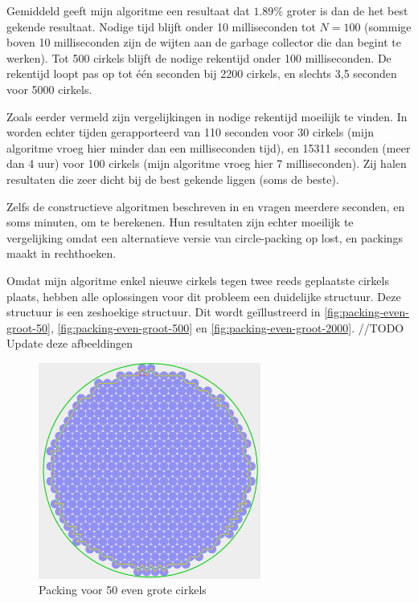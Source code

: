 \documentclass[12pt,a4paper,oneside]{book}
\begin{document}
 \label{table:packomania-equal}

Gemiddeld geeft mijn algoritme een resultaat dat $1.89\%$ groter is dan de het best gekende resultaat.
Nodige tijd blijft onder 10 milliseconden tot $N=100$ (sommige boven 10 milliseconden zijn de wijten aan de garbage collector die dan begint te werken).
Tot 500 cirkels blijft de nodige rekentijd onder 100 milliseconden.
De rekentijd loopt pas op tot één seconden bij 2200 cirkels, en slechts 3,5 seconden voor 5000 cirkels.

Zoals eerder vermeld zijn vergelijkingen in nodige rekentijd moeilijk te vinden.
In \cite{grosso2010} worden echter tijden gerapporteerd van 110 seconden voor 30 cirkels (mijn algoritme vroeg hier minder dan een milliseconden tijd), en 15311 seconden (meer dan 4 uur) voor 100 cirkels (mijn algoritme vroeg hier 7 milliseconden).
Zij halen resultaten die zeer dicht bij de best gekende liggen (soms de beste).

Zelfs de constructieve algoritmen beschreven in \cite{akeb2006basic} en \cite{hifi2004approximate} vragen meerdere seconden, en soms minuten, om te berekenen.
Hun resultaten zijn echter moeilijk te vergelijking omdat \cite{akeb2006basic} een alternatieve versie van circle-packing op lost, en \cite{hifi2004approximate} packings maakt in rechthoeken.

Omdat mijn algoritme enkel nieuwe cirkels tegen twee reeds geplaatste cirkels plaats, hebben alle oplossingen voor dit probleem een duidelijke structuur.
Deze structuur is een zeshoekige structuur.
Dit wordt geïllustreerd in \autoref{fig:packing-even-groot-50}, \autoref{fig:packing-even-groot-500} en \autoref{fig:packing-even-groot-2000}.
//TODO Update deze afbeeldingen

\begin{figure}
  \centering
  \includegraphics[width=0.65\textwidth]{packing-even-groot-50.png}
  \caption{Packing voor 50 even grote cirkels} \label{fig:packing-even-groot-50} 
\end{figure}
\end{document}
